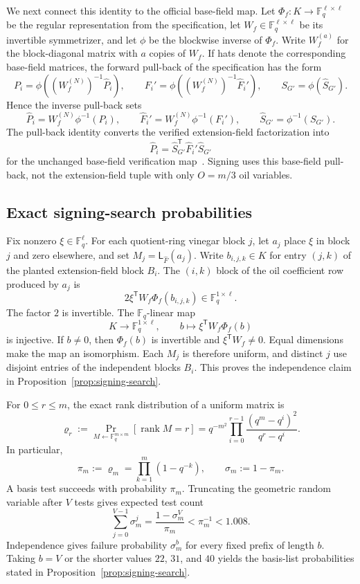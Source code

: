 \documentclass[11pt,a4paper]{article}
\theoremstyle{definition}
\theoremstyle{remark}
\newcommand{\F}{\mathbb F}
\newcommand{\rank}{\operatorname{rank}}
\begin{document}
We next connect this identity to the official base-field map.  Let
$\Phi_f:K\to\F_q^{\ell\times\ell}$ be the regular representation from the
specification, let $W_f\in\F_q^{\ell\times\ell}$ be its invertible
symmetrizer, and let $\phi$ be the blockwise inverse of $\Phi_f$.  Write
$W_f^{(a)}$ for the block-diagonal matrix with $a$ copies of $W_f$.  If hats
denote the corresponding base-field matrices, the forward pull-back of the
specification has the form
\[
 P_i=\phi\!\left((W_f^{(N)})^{-1}\widehat P_i\right),\qquad
 F_i'=\phi\!\left((W_f^{(N)})^{-1}\widehat F_i'\right),\qquad
 S_{G'}=\phi(\widehat S_{G'}).
\]
Hence the inverse pull-back sets
\[
 \widehat P_i=W_f^{(N)}\phi^{-1}(P_i),\qquad
 \widehat F_i'=W_f^{(N)}\phi^{-1}(F_i'),\qquad
 \widehat S_{G'}=\phi^{-1}(S_{G'}).
\]
The pull-back identity converts the verified extension-field factorization
into
\[
 \widehat P_i
 =\widehat S_{G'}^{\mathsf T}\widehat F_i'\widehat S_{G'}
\]
for the unchanged base-field verification map~\cite[Sec.~4.1]{QRUOVSpec}.
Signing uses this base-field pull-back, not the extension-field tuple with only
$O=m/3$ oil variables.

\subsection{Exact signing-search probabilities}

Fix nonzero $\xi\in\F_q^\ell$.  For each quotient-ring vinegar block $j$, let
$a_j$ place $\xi$ in block $j$ and zero elsewhere, and set
$M_j=\mathsf L_{\widehat F}(a_j)$.  Write $b_{i,j,k}\in K$ for entry $(j,k)$
of the planted extension-field block $B_i$.  The $(i,k)$ block of the oil
coefficient row produced by $a_j$ is
\[
 2\xi^{\mathsf T}W_f\Phi_f(b_{i,j,k})\in\F_q^{1\times\ell}.
\]
The factor $2$ is invertible.  The $\F_q$-linear map
\[
 K\longrightarrow\F_q^{1\times\ell},
 \qquad b\longmapsto \xi^{\mathsf T}W_f\Phi_f(b)
\]
is injective.  If $b\ne0$, then $\Phi_f(b)$ is invertible and
$\xi^{\mathsf T}W_f\ne0$.  Equal dimensions make the map an isomorphism.
Each $M_j$ is therefore uniform, and distinct $j$ use disjoint entries of the
independent blocks $B_i$.  This proves the independence claim in
Proposition~\ref{prop:signing-search}.

For $0\le r\le m$, the exact rank distribution of a uniform matrix is
\begin{equation}\label{eq:app-rank-probability}
 \varrho_r
 :=\Pr_{M\leftarrow\F_q^{m\times m}}[\rank M=r]
 =q^{-m^2}\prod_{i=0}^{r-1}\frac{(q^m-q^i)^2}{q^r-q^i}.
\end{equation}
In particular,
\begin{equation}\label{eq:app-square-invertible}
 \pi_m:=\varrho_m=\prod_{k=1}^m(1-q^{-k}),
 \qquad \sigma_m:=1-\pi_m.
\end{equation}
A basis test succeeds with probability $\pi_m$.  Truncating the geometric
random variable after $V$ tests gives expected test count
\[
 \sum_{j=0}^{V-1}\sigma_m^j
 =\frac{1-\sigma_m^V}{\pi_m}<\pi_m^{-1}<1.008.
\]
Independence gives failure probability $\sigma_m^b$ for every fixed prefix of
length $b$.  Taking $b=V$ or the shorter values $22$, $31$, and $40$ yields
the basis-list probabilities stated in Proposition~\ref{prop:signing-search}.
\end{document}

